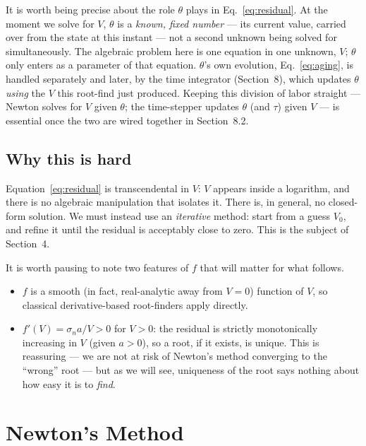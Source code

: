 \begin{remark}
It is worth being precise about the role $\theta$ plays in Eq.~\eqref{eq:residual}. At the moment we solve for $V$, $\theta$ is a \emph{known, fixed number} --- its current value, carried over from the state at this instant --- not a second unknown being solved for simultaneously. The algebraic problem here is one equation in one unknown, $V$; $\theta$ only enters as a parameter of that equation. $\theta$'s own evolution, Eq.~\eqref{eq:aging}, is handled separately and later, by the time integrator (Section~8), which updates $\theta$ \emph{using} the $V$ this root-find just produced. Keeping this division of labor straight --- Newton solves for $V$ given $\theta$; the time-stepper updates $\theta$ (and $\tau$) given $V$ --- is essential once the two are wired together in Section~8.2.
\end{remark}

\subsection{Why this is hard}

Equation~\eqref{eq:residual} is transcendental in $V$: $V$ appears inside a logarithm, and there is no algebraic manipulation that isolates it. There is, in general, no closed-form solution. We must instead use an \emph{iterative} method: start from a guess $V_0$, and refine it until the residual is acceptably close to zero. This is the subject of Section~4.

It is worth pausing to note two features of $f$ that will matter for what follows.
\begin{itemize}
\item $f$ is a smooth (in fact, real-analytic away from $V=0$) function of $V$, so classical derivative-based root-finders apply directly.
\item $f'(V) = \sigma_n a / V > 0$ for $V > 0$: the residual is strictly monotonically increasing in $V$ (given $a>0$), so a root, if it exists, is unique. This is reassuring --- we are not at risk of Newton's method converging to the ``wrong'' root --- but as we will see, uniqueness of the root says nothing about how easy it is to \emph{find}.
\end{itemize}

\section{Newton's Method}

